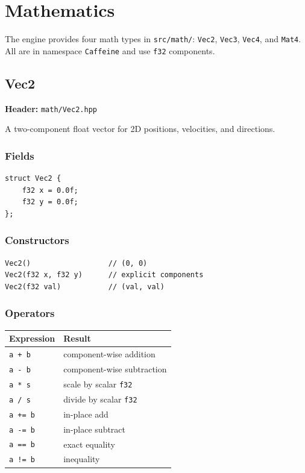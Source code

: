 \chapter{Mathematics}

The engine provides four math types in \texttt{src/math/}: \texttt{Vec2},
\texttt{Vec3}, \texttt{Vec4}, and \texttt{Mat4}. All are in namespace
\texttt{Caffeine} and use \texttt{f32} components.

\section{Vec2}
\label{sec:vec2}

\textbf{Header:} \texttt{math/Vec2.hpp}

A two-component float vector for 2D positions, velocities, and directions.

\subsection{Fields}

\begin{lstlisting}
struct Vec2 {
    f32 x = 0.0f;
    f32 y = 0.0f;
};
\end{lstlisting}

\subsection{Constructors}

\begin{lstlisting}
Vec2()                  // (0, 0)
Vec2(f32 x, f32 y)      // explicit components
Vec2(f32 val)           // (val, val)
\end{lstlisting}

\subsection{Operators}

\begin{longtable}{ll}
\toprule
\textbf{Expression} & \textbf{Result} \\
\midrule
\texttt{a + b}   & component-wise addition \\
\texttt{a - b}   & component-wise subtraction \\
\texttt{a * s}   & scale by scalar \texttt{f32} \\
\texttt{a / s}   & divide by scalar \texttt{f32} \\
\texttt{a += b}  & in-place add \\
\texttt{a -= b}  & in-place subtract \\
\texttt{a == b}  & exact equality \\
\texttt{a != b}  & inequality \\
\bottomrule
\end{longtable}

